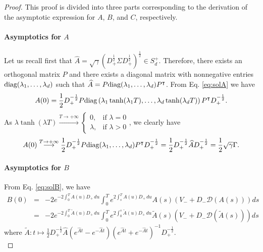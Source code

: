 \documentclass[preprint, 3p]{elsarticle}
\newcommand{\1}{{\chi}}
\begin{document}
\begin{proof}
This proof is divided into three parts corresponding to the derivation of the asymptotic
expression for $A$, $B$, and $C$, respectively.\\

\paragraph{\textbf{Asymptotics for $A$}}
Let us recall first that $\widehat{A}
   = \sqrt{\gamma} \left( D_+^{\frac 12} \Sigma D_+^{\frac 12} \right)^{\frac 12} \in S_d^+$. Therefore, there exists an orthogonal matrix $P$ and there exists a diagonal matrix with nonnegative entries $\textup{diag}(\lambda_1, \ldots, \lambda_d)$ such that $\widehat{A} = P \textup{diag}(\lambda_1, \ldots, \lambda_d) P^{\intercal}$. From Eq. \eqref{eq:solA} we have
\[ A(0) = \frac{1}{2} D^{-\frac 12}_+ P \textup{diag}\left(\lambda_1 \tanh(\lambda_1 T), \ldots, \lambda_d \tanh(\lambda_d T)\right) P^\intercal D_+^{-\frac 12}. \]
   As $\lambda \tanh(\lambda T) \stackrel{T \to +\infty}{\longrightarrow}
\begin{cases}
  0, & \text{if } \lambda = 0 \\
  \lambda, & \text{if } \lambda > 0
\end{cases}$, we clearly have
\[ A(0)
\stackrel{T \to +\infty}{\longrightarrow}
   \frac{1}{2} D^{-\frac 12}_+ P \textup{diag}(\lambda_1, \ldots, \lambda_d)  P^\intercal D_+^{-\frac 12} = \frac{1}{2} D^{-\frac 12}_+ \widehat{A} D_+^{-\frac 12}
=  \frac{1}{2} \sqrt{\gamma} \Gamma. \]

\paragraph{\textbf{Asymptotics for $B$}}

From Eq. \eqref{eq:solB}, we have
\begin{eqnarray*}
B(0) &=& -2 e^{-2 \int_0^T A(u) D_+ \,du} \int_0^T
            e^{ 2 \int_s^T A(u) D_+ \,du} A(s)
            \left( V_- + D_- \mathcal D(A(s)) \right) ds\\
&=& -2 e^{-2 \int_0^T \tilde A(u) D_+ \,du} \int_0^T
            e^{ 2 \int_0^s \tilde A(u) D_+ \,du} \tilde A(s)
            \left( V_- + D_- \mathcal D(\tilde A(s)) \right) ds
\end{eqnarray*}
where $\tilde A : t \mapsto \frac{1}{2} D^{-\frac 12}_+ \widehat{A}
    \left( e^{\widehat{A}t} - e^{-\widehat{A}t} \right)
    \left( e^{\widehat{A}t} + e^{-\widehat{A}t} \right)^{-1} D^{-\frac 12}_+$.\\


\end{proof}
\end{document}
